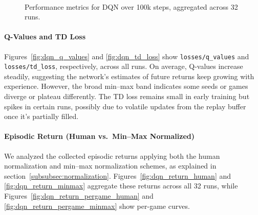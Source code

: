 \begin{figure}
	\centering
	 \quad
	 \\ 
	 \quad
	\caption{Performance metrics for DQN over 100k steps, aggregated across 32 runs.}
	\label{fig:dqn_subfigures}
\end{figure}

\paragraph{Q-Values and TD Loss}
Figures~\ref{fig:dqn_q_values} and \ref{fig:dqn_td_loss} show \texttt{losses/q\_values} and 
\texttt{losses/td\_loss}, respectively, across all runs.
On average, Q-values increase steadily, suggesting the network's estimates 
of future returns keep growing with experience. However, 
the broad min--max band indicates some seeds or games diverge or plateau differently. 
The TD loss remains small in early training but spikes in certain runs, 
possibly due to volatile updates from the replay buffer once it's partially filled.

\paragraph{Episodic Return (Human vs.\ Min--Max Normalized)}
We analyzed the collected episodic returns applying both the human normalization and min--max normalization schemes, as explained in section~\vref{subsubsec:normalization}.
Figures~\ref{fig:dqn_return_human} and \ref{fig:dqn_return_minmax} aggregate 
these returns across all 32 runs, while 
Figures~\ref{fig:dqn_return_pergame_human} and \ref{fig:dqn_return_pergame_minmax} 
show per-game curves.

